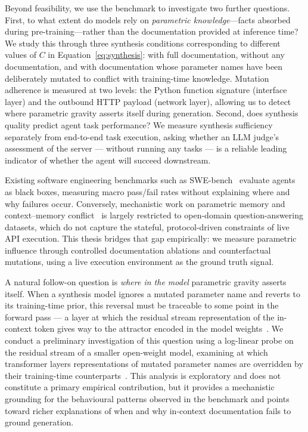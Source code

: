 \documentclass[12pt]{report}
\begin{document}
Beyond feasibility, we use the benchmark to investigate two further questions.
First, to what extent do models rely on \emph{parametric knowledge}---facts
absorbed during pre-training---rather than the documentation provided at
inference time? We study this through three synthesis conditions corresponding
to different values of $C$ in Equation~\ref{eq:synthesis}: with full
documentation, without any documentation, and with documentation whose
parameter names have been deliberately mutated to conflict with training-time
knowledge. Mutation adherence is measured at two levels: the Python function
signature (interface layer) and the outbound HTTP payload (network layer),
allowing us to detect where parametric gravity asserts itself during
generation. Second, does synthesis quality predict agent task performance?
We measure synthesis sufficiency separately from end-to-end task execution,
asking whether an LLM judge's assessment of the server --- without running
any tasks --- is a reliable leading indicator of whether the agent will
succeed downstream.

Existing software engineering benchmarks such as SWE-bench~\cite{jimenez2023swebench}
evaluate agents as black boxes, measuring macro pass/fail rates without
explaining where and why failures occur. Conversely, mechanistic work on
parametric memory and context--memory conflict~\cite{mallen2023knowns,longpre2021entity,juice2025}
is largely restricted to open-domain question-answering datasets, which do not
capture the stateful, protocol-driven constraints of live API execution. This
thesis bridges that gap empirically: we measure parametric influence through
controlled documentation ablations and counterfactual mutations, using a live
execution environment as the ground truth signal.

A natural follow-on question is \emph{where in the model} parametric gravity
asserts itself. When a synthesis model ignores a mutated parameter name and
reverts to its training-time prior, this reversal must be traceable to some
point in the forward pass --- a layer at which the residual stream
representation of the in-context token gives way to the attractor encoded in
the model weights~\cite{meng2022rome,factualrecall2025}. We conduct a
preliminary investigation of this question using a log-linear probe on the
residual stream of a smaller open-weight model, examining at which transformer
layers representations of mutated parameter names are overridden by their
training-time counterparts~\cite{alain2017understanding,belrose2023tunedlens}.
This analysis is exploratory and does not constitute a primary empirical
contribution, but it provides a mechanistic grounding for the behavioural
patterns observed in the benchmark and points toward richer explanations of
when and why in-context documentation fails to ground generation.
\end{document}
